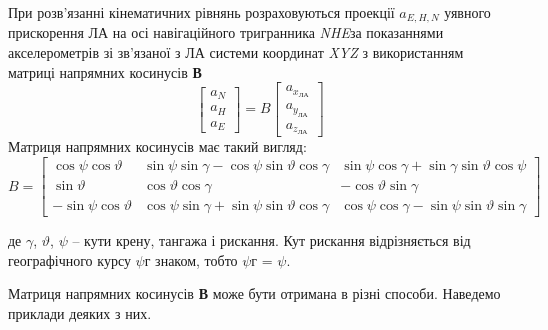 При розв'язанні кінематичних рівнянь розраховуються проекції $a_{E,H,N} $ уявного 
прискорення ЛА на осі навігаційного тригранника \textit{NHE}за показаннями акселерометрів 
зі зв'язаної з ЛА системи координат \textit{XYZ} з використанням матриці напрямних  
косинусів \textbf{В}
\[ \left[\begin{array}{c} 
{a_{N}} \\ 
{a_{H}} \\ 
{a_{E}}
\end{array}\right]=B
\left[\begin{array}{c} 
{a_{x_{\text{ЛА}}}} \\ 
{a_{y_{\text{ЛА}}}} \\ 
{a_{z_{\text{ЛА}}}} 
\end{array}\right]\] 
Матриця напрямних  косинусів  має такий вигляд:
\[B=\left[\begin{array}{c|c|c} 
{\cos \psi \cos \vartheta } & 
{\sin \psi \sin \gamma -\cos \psi \sin \vartheta \cos \gamma } & 
{\sin \psi \cos \gamma +\sin \gamma \sin \vartheta \cos \psi } \\  \hline {\sin \vartheta } & 
{\cos \vartheta \cos \gamma} & 
{-\cos \vartheta \sin \gamma } \\  \hline {-\sin \psi \cos \vartheta } & 
{\cos \psi \sin \gamma +\sin \psi \sin \vartheta \cos \gamma } & 
{\cos \psi \cos \gamma -\sin \psi \sin \vartheta \sin \gamma } 
\end{array}\right]\] 
\begin{ESKDexplanation}
\item де $\gamma$, $\vartheta$, $\psi$ -- кути крену, тангажа і рискання. Кут рискання 
відрізняється від географічного курсу $\psi$г знаком, тобто $\psi$г = $\psi$.
\end{ESKDexplanation}
Матриця напрямних  косинусів \textbf{В} може бути отримана в різні способи. Наведемо приклади 
деяких з них. 

